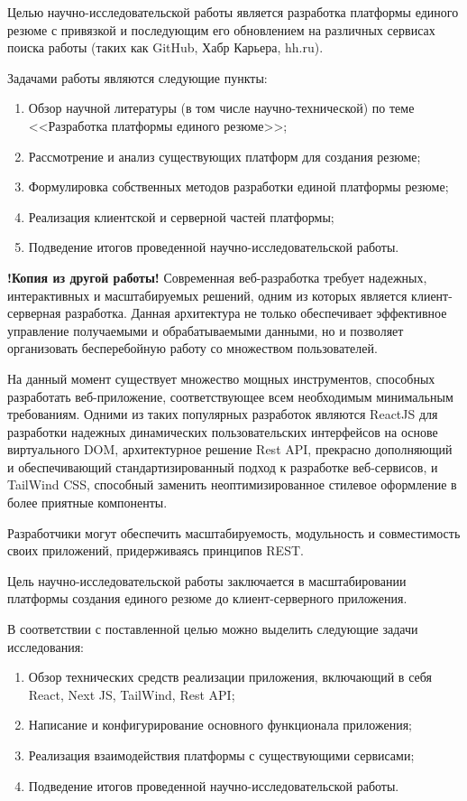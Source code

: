\documentclass[master, och, diploma]{SCWorks}
\begin{document}
Целью научно-исследовательской работы является разработка платформы единого резюме с привязкой и последующим его обновлением на различных сервисах поиска работы (таких как GitHub, Хабр Карьера, hh.ru).

Задачами работы являются следующие пункты:
\begin{enumerate}
    \item Обзор научной литературы (в том числе научно-технической) по теме <<Разработка платформы единого резюме>>;
    \item Рассмотрение и анализ существующих платформ для создания резюме;
    \item Формулировка собственных методов разработки единой платформы резюме;
    \item Реализация клиентской и серверной частей платформы;
    \item Подведение итогов проведенной научно-исследовательской работы.
\end{enumerate}


\textbf{!Копия из другой работы!}
Современная веб-разработка требует надежных, интерактивных и масштабируемых решений, одним из которых является клиент-серверная разработка. Данная архитектура не только обеспечивает эффективное управление получаемыми и обрабатываемыми данными, но и позволяет организовать бесперебойную работу со множеством пользователей.

На данный момент существует множество мощных инструментов, способных разработать веб-приложение, соответствующее всем необходимым минимальным требованиям. Одними из таких популярных разработок являются ReactJS для разработки надежных динамических пользовательских интерфейсов на основе виртуального DOM, архитектурное решение Rest API, прекрасно дополняющий и обеспечивающий стандартизированный подход к разработке веб-сервисов, и TailWind CSS, способный заменить неоптимизированное стилевое оформление в более приятные компоненты.

Разработчики могут обеспечить масштабируемость, модульность и совместимость своих приложений, придерживаясь принципов REST. 

Цель научно-исследовательской работы заключается в масштабировании платформы создания единого резюме до клиент-серверного приложения.

В соответствии с поставленной целью можно выделить следующие задачи исследования: 
\begin{enumerate}
    \item Обзор технических средств реализации приложения, включающий в себя React, Next JS, TailWind, Rest API;
    \item Написание и конфигурирование основного функционала приложения;
    \item Реализация взаимодействия платформы с существующими сервисами;
    \item Подведение итогов проведенной научно-исследовательской работы.
\end{enumerate}
\end{document}
